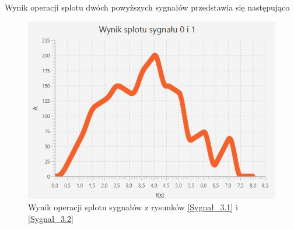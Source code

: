 \documentclass[12pt]{article}
\begin{document}
Wynik operacji splotu dwóch powyższych sygnałów przedstawia się następująco
\begin{figure}[H]
    \centering
	\includegraphics[width=\linewidth]{splot_3.1.png}
    \caption{Wynik operacji splotu sygnałów z rysunków \ref{Sygnał_3.1} i \ref{Sygnał_3.2}}
    \label{Wynik_3.1}
\end{figure}


\newpage
\end{document}
